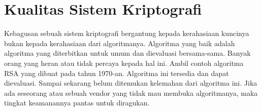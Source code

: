 \section{Kualitas Sistem Kriptografi}
Kebagusan sebuah sistem kriptografi bergantung kepada kerahasiaan kuncinya
bukan kepada kerahasiaan dari algoritmanya. Algoritma yang baik adalah
algoritma yang diterbitkan untuk umum dan dievaluasi bersama-sama. Banyak orang
yang heran atau tidak percaya kepada hal ini. Ambil contoh algoritma RSA yang
dibuat pada tahun 1970-an. Algoritma ini tersedia dan dapat dievaluasi. Sampai
sekarang belum ditemukan kelemahan dari algoritma ini. Jika ada seseorang atau
sebuah vendor yang tidak mau membuka algoritmanya, maka tingkat keamanannya
pantas untuk diragukan.
